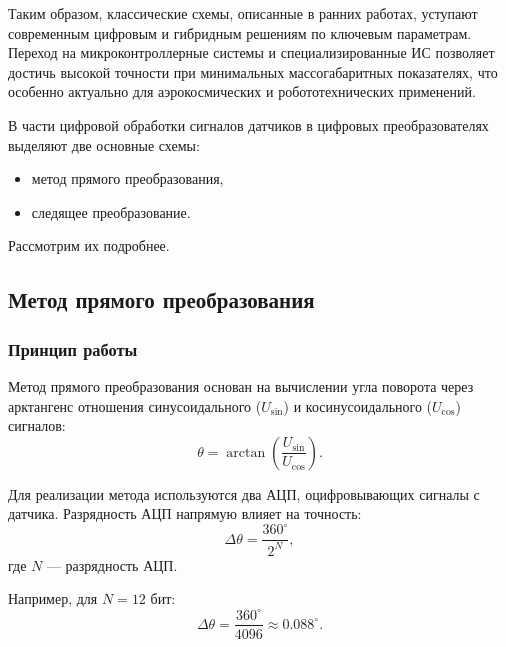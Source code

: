 Таким образом, классические схемы, описанные в ранних работах, уступают современным цифровым и гибридным решениям по ключевым параметрам. 
Переход на микроконтроллерные системы и специализированные ИС позволяет достичь высокой точности при минимальных массогабаритных показателях, 
что особенно актуально для аэрокосмических и робототехнических применений.

В части цифровой обработки сигналов датчиков в цифровых преобразователях выделяют две основные схемы:
\begin{itemize}
    \item метод прямого преобразования,
    \item следящее преобразование.
\end{itemize}
Рассмотрим их подробнее.

\subsection{Метод прямого преобразования}
\subsubsection{Принцип работы}
Метод прямого преобразования \cite{Armenski} основан на вычислении угла поворота через арктангенс отношения синусоидального (\(U_{\sin}\)) и косинусоидального (\(U_{\cos}\)) сигналов:
\begin{equation}
\theta = \arctan\left(\frac{U_{\sin}}{U_{\cos}}\right).
\end{equation}


Для реализации метода используются два АЦП, оцифровывающих сигналы с датчика. Разрядность АЦП напрямую влияет на точность: 
\begin{equation}
\Delta\theta = \frac{360^\circ}{2^N},
\end{equation}
где \(N\) — разрядность АЦП.

Например, для \(N = 12\) бит:
\begin{equation}
\Delta\theta = \frac{360^\circ}{4096} \approx 0.088^\circ.
\end{equation}


